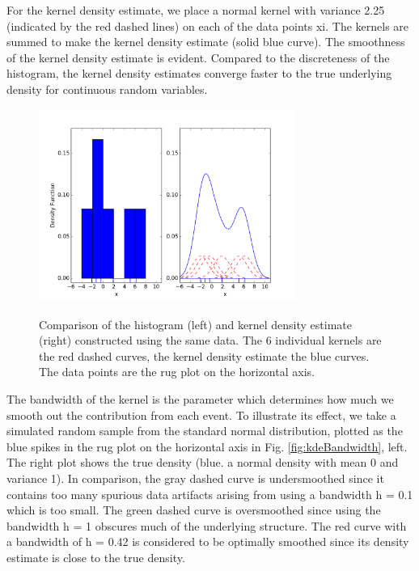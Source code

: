 For the kernel density estimate, we place a normal kernel with variance 2.25 (indicated by the red dashed lines) on each of the data points xi. The kernels are summed to make the kernel density estimate (solid blue curve). The smoothness of the kernel density estimate is evident. Compared to the discreteness of the histogram, the kernel density estimates converge faster to the true underlying density for continuous random variables.

\begin{figure}[ht]
  \centering
  \includegraphics[width=0.75\textwidth]{../Images/KDEexplained.png}\\
  \caption{Comparison of the histogram (left) and kernel density estimate (right) constructed using the same data. The 6 individual kernels are the red dashed curves, the kernel density estimate the blue curves. The data points are the rug plot on the horizontal axis.}
\end{figure}


The bandwidth of the kernel is the parameter which determines how much we smooth out the contribution from each event. To illustrate its effect, we take a simulated random sample from the standard normal distribution, plotted as the blue spikes in the rug plot on the horizontal axis in Fig. \ref{fig:kdeBandwidth}, left. The right plot shows the true density (blue. a normal density with mean 0 and variance 1). In comparison, the gray dashed curve is undersmoothed since it contains too many spurious data artifacts arising from using a bandwidth h = 0.1 which is too small. The green dashed curve is oversmoothed since using the bandwidth h = 1 obscures much of the underlying structure. The red curve with a bandwidth of h = 0.42 is considered to be optimally smoothed since its density estimate is close to the true density.

